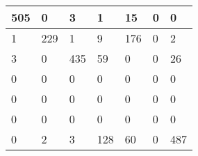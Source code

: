\begin{tabular}{lllllll}
\hline
  505 & 0 & 3 & 1 & 15 & 0 & 0 \\
\hline
  1 & 229 & 1 & 9 & 176 & 0 & 2 \\
\hline
  3 & 0 & 435 & 59 & 0 & 0 & 26 \\
\hline
  0 & 0 & 0 & 0 & 0 & 0 & 0 \\
\hline
  0 & 0 & 0 & 0 & 0 & 0 & 0 \\
\hline
  0 & 0 & 0 & 0 & 0 & 0 & 0 \\
\hline
  0 & 2 & 3 & 128 & 60 & 0 & 487 \\
\hline
\end{tabular}
